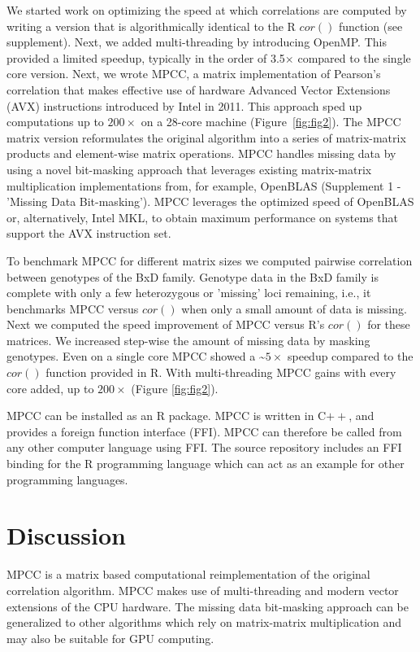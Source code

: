 \documentclass{bioinfo}
\begin{document}
We started work on optimizing the speed at which correlations are computed 
by writing a version that is algorithmically identical to the R $cor()$ function
(see supplement). Next, we added multi-threading by introducing
OpenMP. This provided a limited speedup, typically in the order of
3.5$\times$ compared to the single core version.  Next, we wrote MPCC,
a matrix implementation of Pearson's correlation that makes effective
use of hardware Advanced Vector Extensions (AVX) instructions
introduced by Intel in 2011. This approach sped up computations up to
$200\times$ on a 28-core machine (Figure~\ref{fig:fig2}). The MPCC
matrix version reformulates the original algorithm into a series of
matrix-matrix products and element-wise matrix operations. MPCC
handles missing data by using a novel bit-masking approach that
leverages existing matrix-matrix multiplication implementations from,
for example, OpenBLAS (Supplement 1 - 'Missing Data Bit-masking').
MPCC leverages the optimized speed of OpenBLAS or, alternatively,
Intel\textregistered{} MKL, to obtain maximum performance on systems
that support the AVX instruction set.

To benchmark MPCC for different matrix sizes we computed pairwise
correlation between genotypes of the BxD family.  Genotype data in the
BxD family is complete with only a few heterozygous or 'missing' loci
remaining, i.e., it benchmarks MPCC versus $cor()$ when only a small amount
of data is missing.  Next we computed the speed improvement of MPCC
versus R's $cor()$ for these matrices. We increased step-wise the
amount of missing data by masking genotypes. Even on a single core
MPCC showed a
\textasciitilde{}$5\times$ speedup compared to the $cor()$
function provided in R. With multi-threading MPCC
gains with every core added, up to $200\times$ (Figure \ref{fig:fig2}).

MPCC can be installed as an R package. MPCC is written in C$++$, and
provides a foreign function interface (FFI). MPCC can therefore be
called from any other computer language using FFI. The source
repository includes an FFI binding for the R programming language
which can act as an example for other programming languages.

\vspace*{2mm}
\section{Discussion}

MPCC is a matrix based computational reimplementation of the original
correlation algorithm. MPCC makes use of multi-threading and modern
vector extensions of the CPU hardware.  The  missing data bit-masking
approach can be generalized to other algorithms which rely on
matrix-matrix multiplication and may also be suitable for GPU
computing.
\end{document}
